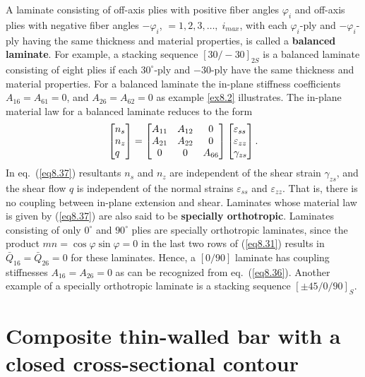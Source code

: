 \documentclass{AeroStructure-ERJohnson}
\begin{document}
A laminate consisting of off-axis plies with positive fiber angles
$\varphi_{i}$ and off-axis plies with negative fiber angles
$-\varphi_{i}$, $=1,2,3, \ldots,\; i_{max }$, with each
$\varphi_{i}$-ply and $-\varphi_{i}$-ply having the same thickness
and material properties, is called a \textbf{balanced laminate}.
For example, a stacking sequence $[30/-30]_{2 S}$ is a balanced
laminate consisting of eight plies if each $30^{\circ}$-ply and
$-30$-ply have the same thickness and material properties. For a
balanced laminate the in-plane stiffness coefficients
$A_{16}=A_{61}=0$, and $A_{26}=A_{62}=0$ as example \ref{ex8.2}
illustrates. The in-plane material law for a balanced laminate
reduces to the form
\begin{align}\label{eq8.37}
\left[\begin{array}{@{}l@{}}n_{s}\\
n_{z}\\
q\end{array}\right]=\left[\begin{array}{@{}ccc@{}}A_{11} &
A_{12} & 0\\
A_{21} & A_{22} & 0\\
0 & 0 &
A_{66}\end{array}\right]\left[\begin{array}{@{}l@{}}\varepsilon_{s
s}\\
\varepsilon_{z z}\\
\gamma_{z s}\end{array}\right].
\end{align}
In eq.~(\ref{eq8.37}) resultants $n_s$ and $n_z$ are
independent of the shear strain $\gamma_{z s}$, and the shear flow
$q$ is independent of the normal strains $\varepsilon_{ss}$ and
$\varepsilon_{zz}$. That is, there is no coupling between in-plane
extension and shear. Laminates whose material law is given by
(\ref{eq8.37}) are also said to be \textbf{specially orthotropic}.
Laminates consisting of only $0^{\circ}$ and $90^{\circ}$ plies
are specially orthotropic laminates, since the product $m n=\cos
\varphi \sin \varphi=0$ in the last two rows of (\ref{eq8.31})
results in $\bar{Q}_{16}=\bar{Q}_{26}=0$ for these laminates.
Hence, a $[0/ 90]$ laminate has coupling stiffnesses
$A_{16}=A_{26}=0$ as can be recognized from eq.~(\ref{eq8.36}).
Another example of a specially orthotropic laminate is a stacking
sequence $[\pm 45/ 0/ 90]_{S}$.

\section{Composite thin-walled bar with a closed cross-sectional contour}\label{sec8.2}
\end{document}
